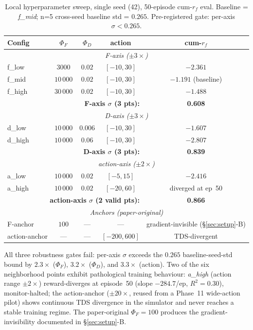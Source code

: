 \documentclass[journal,onecolumn,11pt]{IEEEtran}
\begin{document}
\begin{table}[!t]
  \centering
  \caption{Local hyperparameter sweep, single seed (42), 50-episode
    cum-$r_f$ eval. Baseline = \textit{f\_mid}; n=5 cross-seed
    baseline std = $0.265$. Pre-registered gate: per-axis
    $\sigma < 0.265$.}
  \label{tab:hparam-sweep}
  \footnotesize
  \begin{tabular}{lcccc}
    \toprule
    Config & $\Phi_F$ & $\Phi_D$ & action & cum-$r_f$ \\
    \midrule
    \multicolumn{5}{c}{\emph{F-axis ($\pm 3\times$)}}\\
    f\_low  & $3000$    & $0.02$ & $[-10, 30]$ & $-2.361$ \\
    f\_mid  & $10\,000$ & $0.02$ & $[-10, 30]$ & $-1.191$ (baseline)\\
    f\_high & $30\,000$ & $0.02$ & $[-10, 30]$ & $-1.488$ \\
    \multicolumn{4}{r}{\textbf{F-axis $\sigma$ (3 pts):}} & \textbf{0.608} \\
    \midrule
    \multicolumn{5}{c}{\emph{D-axis ($\pm 3\times$)}}\\
    d\_low  & $10\,000$ & $0.006$ & $[-10, 30]$ & $-1.607$ \\
    d\_high & $10\,000$ & $0.06$  & $[-10, 30]$ & $-2.807$ \\
    \multicolumn{4}{r}{\textbf{D-axis $\sigma$ (3 pts):}} & \textbf{0.839} \\
    \midrule
    \multicolumn{5}{c}{\emph{action-axis ($\pm 2\times$)}}\\
    a\_low  & $10\,000$ & $0.02$ & $[-5, 15]$  & $-2.416$ \\
    a\_high & $10\,000$ & $0.02$ & $[-20, 60]$ & diverged at ep~50 \\
    \multicolumn{4}{r}{\textbf{action-axis $\sigma$ (2 valid pts):}} & \textbf{0.866} \\
    \midrule
    \multicolumn{5}{c}{\emph{Anchors (paper-original)}}\\
    F-anchor      & $100$ & --- & --- & gradient-invisible (\S\ref{sec:setup}-B) \\
    action-anchor & --- & --- & $[-200, 600]$ & TDS-divergent \\
    \bottomrule
  \end{tabular}
\end{table}

All three robustness gates fail: per-axis $\sigma$ exceeds the
$0.265$ baseline-seed-std bound by $2.3\times$ ($\Phi_F$),
$3.2\times$ ($\Phi_D$), and $3.3\times$ (action). Two of the six
neighborhood points exhibit pathological training behaviour:
\textit{a\_high} (action range $\pm 2\times$) reward-diverges at
episode~50 (slope $-284.7$/ep, $R^2 = 0.30$), monitor-halted; the
action-anchor ($\pm 20\times$, reused from a Phase~11 wide-action
pilot) shows continuous TDS divergence in the simulator and never
reaches a stable training regime. The paper-original $\Phi_F = 100$
produces the gradient-invisibility documented in \S\ref{sec:setup}-B.
\end{document}
